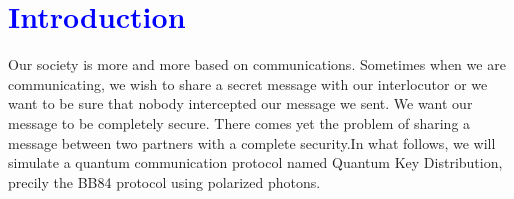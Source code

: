 \documentclass[a4paper,12pt]{article}
\begin{document}
\section*{\textcolor{blue}{Introduction}}
	Our society is more and more based on communications. Sometimes when we are communicating, we wish to share a secret message with our interlocutor or we want to be sure that nobody intercepted our message we sent. We want our message to be completely secure. There comes yet the problem of sharing a message between two partners with a complete security.In what follows, we will simulate a quantum communication protocol named Quantum Key Distribution, precily the BB84 protocol using polarized photons.
	\\[0.2cm]
\end{document}
